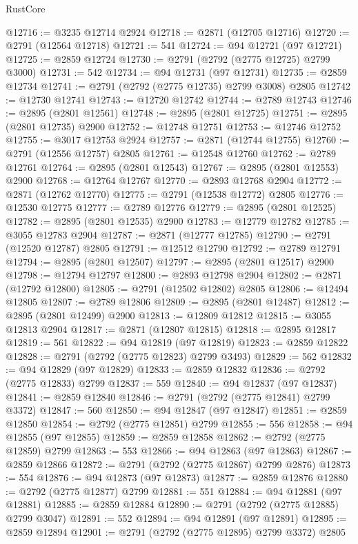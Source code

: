 \begin{lexlean}{RustCore}
\begin{coremodule}
@12716 := @3235 @12714 @2924
@12718 := @2871 (@12705 @12716)
@12720 := @2791 (@12564 @12718)
@12721 := 541
@12724 := @94 @12721 (@97 @12721)
@12725 := @2859 @12724
@12730 := @2791 (@2792 (@2775 @12725) @2799 @3000)
@12731 := 542
@12734 := @94 @12731 (@97 @12731)
@12735 := @2859 @12734
@12741 := @2791 (@2792 (@2775 @12735) @2799 @3008) @2805
@12742 := @12730 @12741
@12743 := @12720 @12742
@12744 := @2789 @12743
@12746 := @2895 (@2801 @12561)
@12748 := @2895 (@2801 @12725)
@12751 := @2895 (@2801 @12735) @2900
@12752 := @12748 @12751
@12753 := @12746 @12752
@12755 := @3017 @12753 @2924
@12757 := @2871 (@12744 @12755)
@12760 := @2791 (@12556 @12757) @2805
@12761 := @12548 @12760
@12762 := @2789 @12761
@12764 := @2895 (@2801 @12543)
@12767 := @2895 (@2801 @12553) @2900
@12768 := @12764 @12767
@12770 := @2893 @12768 @2904
@12772 := @2871 (@12762 @12770)
@12775 := @2791 (@12538 @12772) @2805
@12776 := @12530 @12775
@12777 := @2789 @12776
@12779 := @2895 (@2801 @12525)
@12782 := @2895 (@2801 @12535) @2900
@12783 := @12779 @12782
@12785 := @3055 @12783 @2904
@12787 := @2871 (@12777 @12785)
@12790 := @2791 (@12520 @12787) @2805
@12791 := @12512 @12790
@12792 := @2789 @12791
@12794 := @2895 (@2801 @12507)
@12797 := @2895 (@2801 @12517) @2900
@12798 := @12794 @12797
@12800 := @2893 @12798 @2904
@12802 := @2871 (@12792 @12800)
@12805 := @2791 (@12502 @12802) @2805
@12806 := @12494 @12805
@12807 := @2789 @12806
@12809 := @2895 (@2801 @12487)
@12812 := @2895 (@2801 @12499) @2900
@12813 := @12809 @12812
@12815 := @3055 @12813 @2904
@12817 := @2871 (@12807 @12815)
@12818 := @2895 @12817
@12819 := 561
@12822 := @94 @12819 (@97 @12819)
@12823 := @2859 @12822
@12828 := @2791 (@2792 (@2775 @12823) @2799 @3493)
@12829 := 562
@12832 := @94 @12829 (@97 @12829)
@12833 := @2859 @12832
@12836 := @2792 (@2775 @12833) @2799
@12837 := 559
@12840 := @94 @12837 (@97 @12837)
@12841 := @2859 @12840
@12846 := @2791 (@2792 (@2775 @12841) @2799 @3372)
@12847 := 560
@12850 := @94 @12847 (@97 @12847)
@12851 := @2859 @12850
@12854 := @2792 (@2775 @12851) @2799
@12855 := 556
@12858 := @94 @12855 (@97 @12855)
@12859 := @2859 @12858
@12862 := @2792 (@2775 @12859) @2799
@12863 := 553
@12866 := @94 @12863 (@97 @12863)
@12867 := @2859 @12866
@12872 := @2791 (@2792 (@2775 @12867) @2799 @2876)
@12873 := 554
@12876 := @94 @12873 (@97 @12873)
@12877 := @2859 @12876
@12880 := @2792 (@2775 @12877) @2799
@12881 := 551
@12884 := @94 @12881 (@97 @12881)
@12885 := @2859 @12884
@12890 := @2791 (@2792 (@2775 @12885) @2799 @3047)
@12891 := 552
@12894 := @94 @12891 (@97 @12891)
@12895 := @2859 @12894
@12901 := @2791 (@2792 (@2775 @12895) @2799 @3372) @2805

\end{coremodule}
\end{lexlean}
